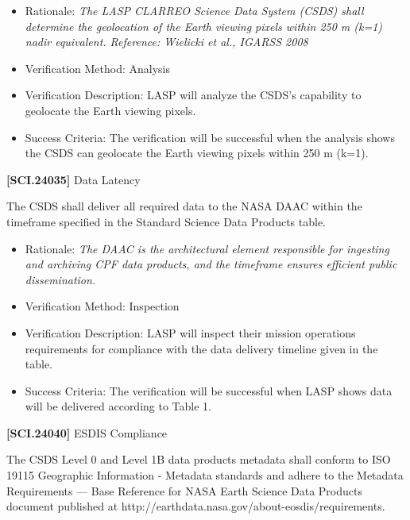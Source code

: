 \begin{itemize}
\item{} Rationale: \emph{The LASP CLARREO Science Data System (CSDS) shall determine the geolocation of the Earth viewing pixels within 250 m (k=1) nadir equivalent. Reference: Wielicki et al., IGARSS 2008}

\item{} Verification Method: Analysis

\item{} Verification Description: \gls{LASP} will analyze the \gls{CSDS}'s capability to geolocate the Earth viewing pixels.

\item{} Success Criteria: The verification will be successful when the \gls{analysis} shows the \gls{CSDS} can geolocate the Earth viewing pixels within 250 m (k=1).

\end{itemize}

\textbf{[SCI.24035]} Data Latency

The \gls{CSDS} shall deliver all required data to the NASA \gls{DAAC} within the timeframe specified in the Standard Science Data Products table.

\begin{itemize}
\item{} Rationale: \emph{The DAAC is the architectural element responsible for ingesting and archiving CPF data products, and the timeframe ensures efficient public dissemination.}

\item{} Verification Method: Inspection

\item{} Verification Description: \gls{LASP} will inspect their mission operations requirements for compliance with the data delivery timeline given in the table.

\item{} Success Criteria: The verification will be successful when \gls{LASP} shows data will be delivered according to Table 1.

\end{itemize}

\textbf{[SCI.24040]} \gls{ESDIS} Compliance

The \gls{CSDS} Level 0 and Level 1B data products metadata shall conform to ISO 19115 Geographic Information - Metadata standards and adhere to the Metadata Requirements --- Base Reference for NASA Earth Science Data Products document published at http:\slash \slash earthdata.nasa.gov\slash about-eosdis\slash requirements.

